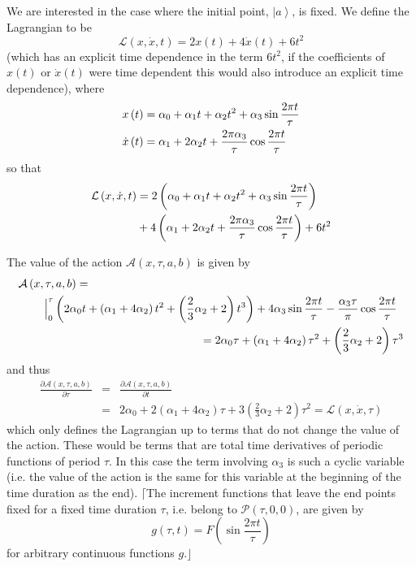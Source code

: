 \documentclass[aps,preprint]{revtex4}
\begin{document}
We are interested in the case where the initial point, $\left\vert
a\right\rangle $, is fixed. We define the Lagrangian to be
\begin{equation}
\mathcal{L}\left( x,\dot{x},t\right) =2x\left( t\right) +4\dot{x}\left(
t\right) +6t^{2}
\end{equation}%
(which has an explicit time dependence in the term $6t^{2}$, if the
coefficients of $x\left( t\right) $ or $\dot{x}\left( t\right) $ were time
dependent this would also introduce an explicit time dependence), where%
\begin{align}
x\left( t\right) & =\alpha _{0}+\alpha _{1}t+\alpha _{2}t^{2}+\alpha
_{3}\sin \frac{2\pi t}{\tau }  \notag \\
\dot{x}\left( t\right) & =\alpha _{1}+2\alpha _{2}t+\frac{2\pi \alpha _{3}}{%
\tau }\cos \frac{2\pi t}{\tau }
\end{align}%
so that
\begin{align}
\mathcal{L}\left( x,\dot{x},t\right) & =2\left( \alpha _{0}+\alpha
_{1}t+\alpha _{2}t^{2}+\alpha _{3}\sin \frac{2\pi t}{\tau }\right)  \notag \\
& +4\left( \alpha _{1}+2\alpha _{2}t+\frac{2\pi \alpha _{3}}{\tau }\cos
\frac{2\pi t}{\tau }\right) +6t^{2}
\end{align}

The value of the action $\mathcal{A}\left( x,\tau ,a,b\right) $ is given by
\begin{align}
& \mathcal{A}\left( x,\tau ,a,b\right) =  \notag \\
& \qquad \left. \underset{}{}\right\vert _{0}^{\tau }\left( 2\alpha
_{0}t+\left( \alpha _{1}+4\alpha _{2}\right) t^{2}+\left( \frac{2}{3}\alpha
_{2}+2\right) t^{3}\right) +4\alpha _{3}\sin \frac{2\pi t}{\tau }-\frac{%
\alpha _{3}\tau }{\pi }\cos \frac{2\pi t}{\tau }  \notag \\
& \qquad \qquad \qquad \qquad \qquad \qquad \qquad \qquad =2\alpha _{0}\tau
+\left( \alpha _{1}+4\alpha _{2}\right) \tau ^{2}+\left( \frac{2}{3}\alpha
_{2}+2\right) \tau ^{3}
\end{align}%
and thus%
\begin{eqnarray}
\frac{\partial \mathcal{A}\left( x,\tau ,a,b\right) }{\partial \tau } &=&%
\frac{\partial \mathcal{A}\left( x,\tau ,a,b\right) }{\partial t} \\
&=&2\alpha _{0}+2\left( \alpha _{1}+4\alpha _{2}\right) \tau +3\left( \frac{2%
}{3}\alpha _{2}+2\right) \tau ^{2}=\mathcal{L}\left( x,\dot{x},\tau \right)
\end{eqnarray}%
which only defines the Lagrangian up to terms that do not change the value
of the action. These would be terms that are total time derivatives of
periodic functions of period $\tau $. In this case the term involving $%
\alpha _{3}$ is such a cyclic variable (i.e. the value of the action is the
same for this variable at the beginning of the time duration as the end). $%
\lceil $The increment functions that leave the end points fixed for a fixed
time duration $\tau $, i.e. belong to $\mathcal{P}\left( \tau ,0,0\right) $,
are given by
\begin{equation}
g\left( \tau ,t\right) =F\left( \sin \frac{2\pi t}{\tau }\right)
\end{equation}%
for arbitrary continuous functions $g$.$\rfloor $
\end{document}
